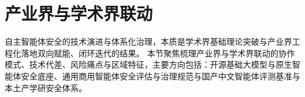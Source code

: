 

\section{产业界与学术界联动}
自主智能体安全的技术演进与体系化治理，本质是学术界基础理论突破与产业界工程化落地双向赋能、闭环迭代的结果。
本节聚焦梳理产业界与学术界联动的协作模式、技术代差、风险痛点与区域特征，主要方向包括：开源基础大模型与原生智能体安全底座、通用商用智能体安全评估与治理规范与国产中文智能体评测基准与本土产学研安全体系。

